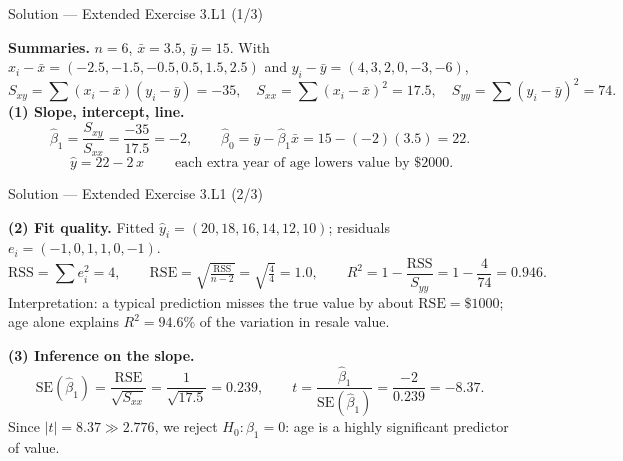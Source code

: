 \documentclass[aspectratio=169,11pt]{beamer}
\begin{document}
\begin{frame}{Solution --- Extended Exercise 3.L1 (1/3)}
  \begin{solutionbox}
    \textbf{Summaries.} $n=6$, $\bar x=3.5$, $\bar y=15$. With
    $x_i-\bar x=(-2.5,-1.5,-0.5,0.5,1.5,2.5)$ and
    $y_i-\bar y=(4,3,2,0,-3,-6)$,
    \[
      S_{xy}=\sum(x_i-\bar x)(y_i-\bar y)=-35,\quad
      S_{xx}=\sum(x_i-\bar x)^2=17.5,\quad
      S_{yy}=\sum(y_i-\bar y)^2=74.
    \]
    \textbf{(1) Slope, intercept, line.}
    \[
      \hat\beta_1=\frac{S_{xy}}{S_{xx}}=\frac{-35}{17.5}=-2,\qquad
      \hat\beta_0=\bar y-\hat\beta_1\bar x=15-(-2)(3.5)=22.
    \]
    \[
      \boxed{\ \hat y = 22 - 2\,x\ }\qquad
      \text{each extra year of age lowers value by }\$2000.
    \]
  \end{solutionbox}
\end{frame}

\begin{frame}{Solution --- Extended Exercise 3.L1 (2/3)}
  \begin{solutionbox}
    \textbf{(2) Fit quality.} Fitted $\hat y_i=(20,18,16,14,12,10)$;
    residuals $e_i=(-1,0,1,1,0,-1)$.
    \[
      \mathrm{RSS}=\sum e_i^2=4,\qquad
      \mathrm{RSE}=\sqrt{\tfrac{\mathrm{RSS}}{n-2}}=\sqrt{\tfrac{4}{4}}=1.0,\qquad
      R^2=1-\frac{\mathrm{RSS}}{S_{yy}}=1-\frac{4}{74}=0.946.
    \]
    Interpretation: a typical prediction misses the true value by about
    $\mathrm{RSE}=\$1000$; age alone explains $R^2=94.6\%$ of the
    variation in resale value.

    \textbf{(3) Inference on the slope.}
    \[
      \mathrm{SE}(\hat\beta_1)=\frac{\mathrm{RSE}}{\sqrt{S_{xx}}}
      =\frac{1}{\sqrt{17.5}}=0.239,\qquad
      t=\frac{\hat\beta_1}{\mathrm{SE}(\hat\beta_1)}=\frac{-2}{0.239}=-8.37.
    \]
    Since $|t|=8.37\gg 2.776$, we reject $H_0:\beta_1=0$: age is a highly
    significant predictor of value.
  \end{solutionbox}
\end{frame}
\end{document}
